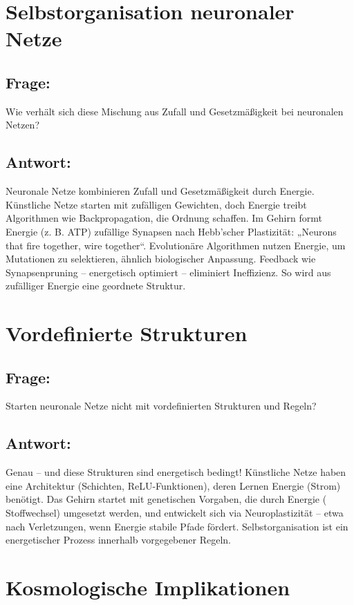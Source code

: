 \documentclass{article}
\begin{document}
	\section{Selbstorganisation neuronaler Netze}
	
	\subsection*{Frage:}
	Wie verhält sich diese Mischung aus Zufall und Gesetzmäßigkeit bei neuronalen Netzen?
	
	\subsection*{Antwort:}
	Neuronale Netze kombinieren Zufall und Gesetzmäßigkeit durch Energie. Künstliche Netze starten mit zufälligen Gewichten, doch Energie treibt Algorithmen wie Backpropagation, die Ordnung schaffen. Im Gehirn formt Energie (z. B. ATP) zufällige Synapsen nach Hebb’scher Plastizität: „Neurons that fire together, wire together“. Evolutionäre Algorithmen nutzen Energie, um Mutationen zu selektieren, ähnlich biologischer Anpassung. Feedback wie Synapsenpruning – energetisch optimiert – eliminiert Ineffizienz. So wird aus zufälliger Energie eine geordnete Struktur.
	
	\section{Vordefinierte Strukturen}
	
	\subsection*{Frage:}
	Starten neuronale Netze nicht mit vordefinierten Strukturen und Regeln?
	
	\subsection*{Antwort:}
	Genau – und diese Strukturen sind energetisch bedingt! Künstliche Netze haben eine Architektur (Schichten, ReLU-Funktionen), deren Lernen Energie (Strom) benötigt. Das Gehirn startet mit genetischen Vorgaben, die durch Energie ( Stoffwechsel) umgesetzt werden, und entwickelt sich via Neuroplastizität – etwa nach Verletzungen, wenn Energie stabile Pfade fördert. Selbstorganisation ist ein energetischer Prozess innerhalb vorgegebener Regeln.
	
	\section{Kosmologische Implikationen}
\end{document}
